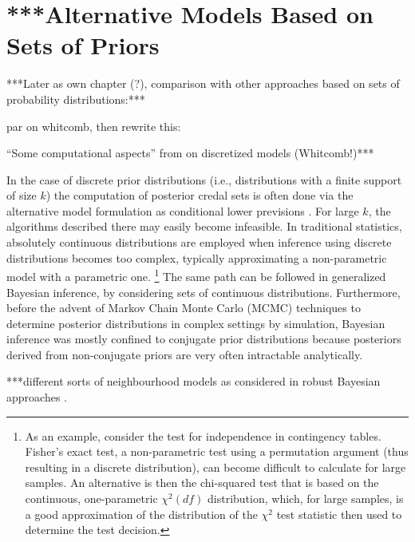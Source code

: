 \section{***Alternative Models Based on Sets of Priors}
\label{sec:alternatives}

***Later as own chapter (?), comparison with other approaches based on sets of probability distributions:***

\bigskip

par on whitcomb, then rewrite this:

``Some computational aspects'' from \textcite[\S 4.2]{itip-statinf} on discretized models (Whitcomb!)***

In the case of discrete prior distributions (i.e., distributions with a finite support of size $k$)
the computation of posterior credal sets is often done
via the alternative model formulation as conditional lower previsions
\parencite[see, e.g.,][]{itip-computation}.
For large $k$, the algorithms described there may easily become infeasible.
In traditional statistics, absolutely continuous distributions are employed
when inference using discrete distributions becomes too complex,
typically approximating a non-parametric model with a parametric one.%
\footnote{As an example, consider the test for independence in contingency tables.
Fisher's exact test, a non-parametric test using a permutation argument (thus resulting in a discrete distribution),
can become difficult to calculate for large samples.
An alternative is then the chi-squared test that is based on the continuous, one-parametric $\chi^2(df)$ distribution,
which, for large samples, is a good approximation of the distribution of the $\chi^2$ test statistic then used to determine the test decision.}
The same path can be followed in generalized Bayesian inference,
by considering sets of continuous distributions.
Furthermore, before the advent of Markov Chain Monte Carlo (MCMC) techniques \parencite[see, e.g.,][]{1998:gilks}
to determine posterior distributions in complex settings by simulation,
Bayesian inference was mostly confined to conjugate prior distributions
because posteriors derived from non-conjugate priors are very often intractable analytically.

\bigskip

***different sorts of neighbourhood models as considered in robust Bayesian approaches \parencite[e.g.,][]{1994:berger}.


